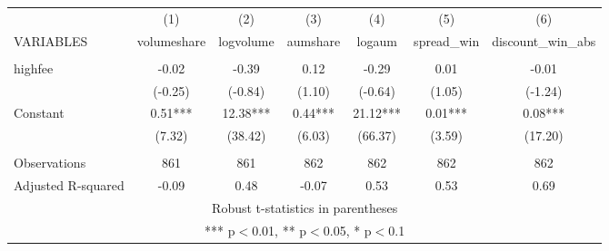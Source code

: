 \documentclass[]{article}
\begin{document}
\begin{tabular}{lcccccc} \hline
 & (1) & (2) & (3) & (4) & (5) & (6) \\
VARIABLES & volumeshare & logvolume & aumshare & logaum & spread\_win & discount\_win\_abs \\ \hline
 &  &  &  &  &  &  \\
highfee & -0.02 & -0.39 & 0.12 & -0.29 & 0.01 & -0.01 \\
 & (-0.25) & (-0.84) & (1.10) & (-0.64) & (1.05) & (-1.24) \\
Constant & 0.51*** & 12.38*** & 0.44*** & 21.12*** & 0.01*** & 0.08*** \\
 & (7.32) & (38.42) & (6.03) & (66.37) & (3.59) & (17.20) \\
 &  &  &  &  &  &  \\
Observations & 861 & 861 & 862 & 862 & 862 & 862 \\
 Adjusted R-squared & -0.09 & 0.48 & -0.07 & 0.53 & 0.53 & 0.69 \\ \hline
\multicolumn{7}{c}{ Robust t-statistics in parentheses} \\
\multicolumn{7}{c}{ *** p$<$0.01, ** p$<$0.05, * p$<$0.1} \\
\end{tabular}
\end{document}
